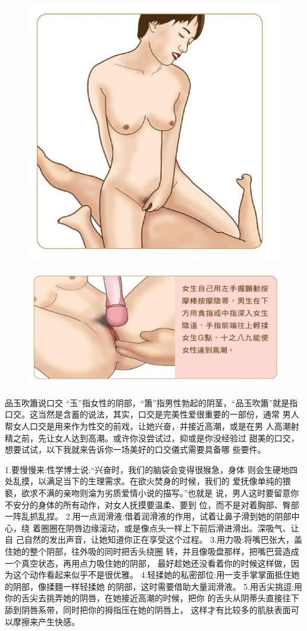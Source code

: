 \documentclass[12pt,UTF8]{ctexbook}
\begin{document}
\begin{figure}[htbp]
	\centering
	\includegraphics[width=0.7\linewidth]{17}
	\caption{}
	\label{fig:1}
\end{figure}

\begin{figure}[htbp]
	\centering
	\includegraphics[width=0.7\linewidth]{18}
	\caption{}
	\label{fig:1}
\end{figure}

品玉吹簫说口交
“玉”指女性的阴部，“簫”指男性勃起的阴茎，“品玉吹簫”就是指
口交。这当然是含蓄的说法，其实，口交是完美性爱很重要的一部份，通常
男人帮女人口交是用来作为性交的前戏，让她兴奋，并接近高潮，或是在男
人高潮射精之前，先让女人达到高潮。或许你没尝试过，抑或是你没经验过
甜美的口交，想要试试，以下我就来告诉你一场美好的口交儀式需要具备哪
些要件。

1.要慢慢来:性学博士说:“兴奋时，我们的脑袋会变得很猴急，身体
则会生硬地四处乱摸，以满足当下的生理需求。在欲火焚身的时候，我们的
爱抚像单纯的猥褻，欲求不满的亲吻则淪为劣质爱情小说的描写。”也就是
说，男人这时要留意你不安分的身体的所有动作，对女人抚摸要温柔、要到
位，而不是对着胸部、臀部一阵乱抓乱捏。
2.用一点润滑液:借着润滑液的作用，试着让鼻子滑到她的阴部中心，绕
着圈圈在阴唇边缘滚动，或是像点头一样上下前后滑进滑出。深吸气、让自
己自然的发出声音，让她知道你正在享受这个过程。
3.用力吸:将嘴巴张大，盖住她的整个阴部，往外吸的同时把舌头绕圈
转，并且像吸盘那样，把嘴巴营造成一个真空状态，再用点力吸住她的阴部，
最好趁她还没看着你的时候这样做，因为这个动作看起来似乎不是很优雅。
4.轻揉她的私密部位:用一支手掌掌面抵住她的阴部，像揉麵一样轻揉她
的阴部，这时需要借助大量润滑液。
5.用舌尖挑逗:用你的舌尖去挑弄她的阴唇，在她接近高潮的时候，把你
的舌头从阴蒂头直接往下舔到阴唇系带，同时把你的拇指压在她的阴唇上，
这样才有比较多的肌肤表面可以摩擦来产生快感。
\end{document}
